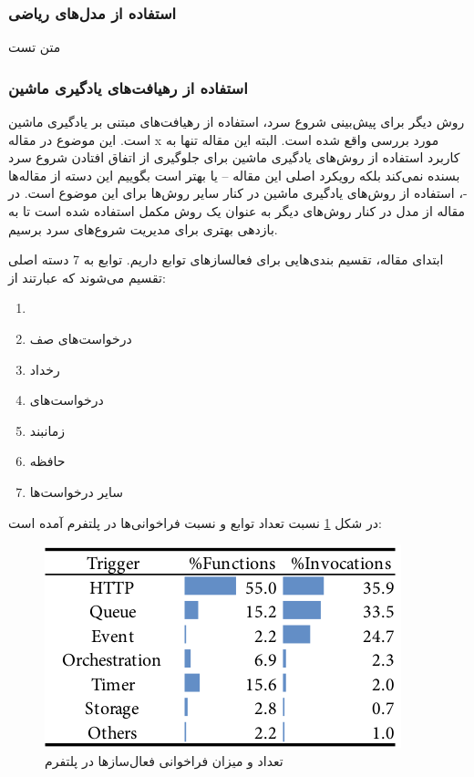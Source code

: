 \subsubsection{استفاده از مدل‌های ریاضی }

متن تست

\subsubsection{استفاده از رهیافت‌های یادگیری ماشین}

روش دیگر برای پیش‌بینی شروع سرد، استفاده‌ از رهیافت‌های مبتنی بر یادگیری ماشین است. این موضوع در مقاله x مورد بررسی واقع شده است. البته این مقاله تنها به کاربرد استفاده از روش‌های یادگیری ماشین برای جلوگیری از اتفاق افتادن شروع سرد بسنده نمی‌کند بلکه رویکرد اصلی این مقاله – یا بهتر است بگوییم این دسته از مقاله‌ها -، استفاده از روش‌های یادگیری ماشین در کنار سایر روش‌ها برای این موضوع است. در مقاله \cite{shahrad2020serverless} از مدل  در کنار روش‌های دیگر به عنوان یک روش مکمل استفاده شده است تا به بازدهی بهتری برای مدیریت شروع‌های سرد برسیم. 

ابتدای مقاله‌، تقسیم بندی‌هایی برای فعالساز‌های توابع داریم. توابع به 7 دسته اصلی تقسیم می‌شوند که عبارتند از: 

\begin{enumerate}
	\item {}
	\item درخواست‌های صف
	\item رخداد
	\item درخواست‌های 
	\item زمانبند
	\item حافظه
	\item سایر درخواست‌ها
\end{enumerate}

در شکل \ref{fig:Azure-Trigger-invocations} نسبت تعداد توابع و نسبت فراخوانی‌ها در پلتفرم  آمده است:‌

\begin{figure}
	\centering
	\includegraphics[width=0.8\linewidth]{figs/Azure-Trigger-invocations}
	\caption {تعداد و میزان فراخوانی فعال‌سازها در پلتفرم }
	\label{fig:Azure-Trigger-invocations}
\end{figure}

